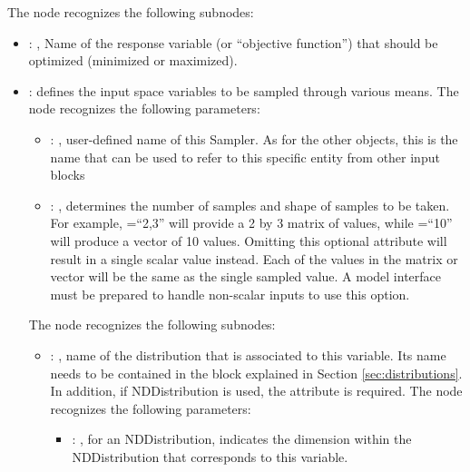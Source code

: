   The  node recognizes the following subnodes:
  \begin{itemize}
    \item {}: , 
      Name of the response variable (or ``objective function'') that should be optimized
      (minimized or maximized).

    \item {}:
      defines the input space variables to be sampled through various means.
      The  node recognizes the following parameters:
        \begin{itemize}
          \item {}: , 
            user-defined name of this Sampler. \nb As for the other objects,               this is
            the name that can be used to refer to this specific entity from other input blocks
          \item {}: , 
            determines the number of samples and shape of samples               to be taken.  For
            example, =``2,3'' will provide a 2 by 3               matrix of values,
            while =``10'' will produce a vector of 10 values.               Omitting
            this optional attribute will result in a single scalar value instead.               Each
            of the values in the matrix or vector will be the same as the single sampled value.
            \nb A model interface must be prepared to handle non-scalar inputs to use this option.
      \end{itemize}

      The  node recognizes the following subnodes:
      \begin{itemize}
        \item {}: , 
          name of the distribution that is associated to this variable.               Its name needs
          to be contained in the  block explained               in Section
          \ref{sec:distributions}. In addition, if NDDistribution is used,               the
          attribute  is required. 
          The  node recognizes the following parameters:
            \begin{itemize}
              \item {}: , 
                for an NDDistribution, indicates the dimension within the NDDistribution that
                corresponds               to this variable.
          \end{itemize}


\end{itemize}
\end{itemize}
